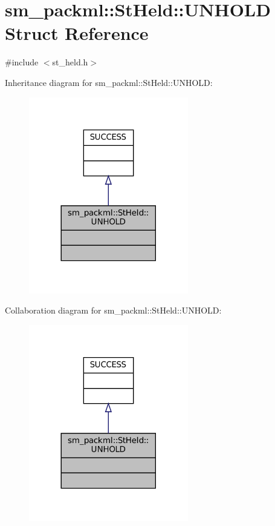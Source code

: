 \hypertarget{structsm__packml_1_1StHeld_1_1UNHOLD}{}\section{sm\+\_\+packml\+:\+:St\+Held\+:\+:U\+N\+H\+O\+LD Struct Reference}
\label{structsm__packml_1_1StHeld_1_1UNHOLD}


{\ttfamily \#include $<$st\+\_\+held.\+h$>$}



Inheritance diagram for sm\+\_\+packml\+:\+:St\+Held\+:\+:U\+N\+H\+O\+LD\+:
\nopagebreak
\begin{figure}[H]
\begin{center}
\leavevmode
\includegraphics[width=197pt]{structsm__packml_1_1StHeld_1_1UNHOLD__inherit__graph}
\end{center}
\end{figure}


Collaboration diagram for sm\+\_\+packml\+:\+:St\+Held\+:\+:U\+N\+H\+O\+LD\+:
\nopagebreak
\begin{figure}[H]
\begin{center}
\leavevmode
\includegraphics[width=197pt]{structsm__packml_1_1StHeld_1_1UNHOLD__coll__graph}
\end{center}
\end{figure}



